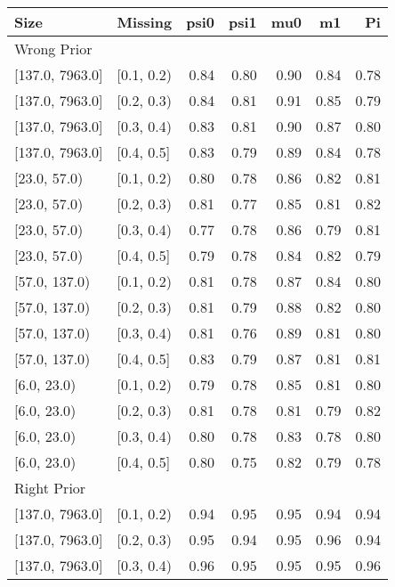 \begin{table}[ht]
\centering
\begin{tabular}{llrrrrr}
  \toprule
Size & Missing & psi0 & psi1 & mu0 & m1 & Pi \\ 
  \midrule
\multicolumn{7}{l}{Wrong Prior}\\
{[137.0, 7963.0]} & {[0.1, 0.2)} & 0.84 & 0.80 & 0.90 & 0.84 & 0.78 \\ 
  {[137.0, 7963.0]} & {[0.2, 0.3)} & 0.84 & 0.81 & 0.91 & 0.85 & 0.79 \\ 
  {[137.0, 7963.0]} & {[0.3, 0.4)} & 0.83 & 0.81 & 0.90 & 0.87 & 0.80 \\ 
  {[137.0, 7963.0]} & {[0.4, 0.5]} & 0.83 & 0.79 & 0.89 & 0.84 & 0.78 \\ 
  {[23.0, 57.0)} & {[0.1, 0.2)} & 0.80 & 0.78 & 0.86 & 0.82 & 0.81 \\ 
  {[23.0, 57.0)} & {[0.2, 0.3)} & 0.81 & 0.77 & 0.85 & 0.81 & 0.82 \\ 
  {[23.0, 57.0)} & {[0.3, 0.4)} & 0.77 & 0.78 & 0.86 & 0.79 & 0.81 \\ 
  {[23.0, 57.0)} & {[0.4, 0.5]} & 0.79 & 0.78 & 0.84 & 0.82 & 0.79 \\ 
  {[57.0, 137.0)} & {[0.1, 0.2)} & 0.81 & 0.78 & 0.87 & 0.84 & 0.80 \\ 
  {[57.0, 137.0)} & {[0.2, 0.3)} & 0.81 & 0.79 & 0.88 & 0.82 & 0.80 \\ 
  {[57.0, 137.0)} & {[0.3, 0.4)} & 0.81 & 0.76 & 0.89 & 0.81 & 0.80 \\ 
  {[57.0, 137.0)} & {[0.4, 0.5]} & 0.83 & 0.79 & 0.87 & 0.81 & 0.81 \\ 
  {[6.0, 23.0)} & {[0.1, 0.2)} & 0.79 & 0.78 & 0.85 & 0.81 & 0.80 \\ 
  {[6.0, 23.0)} & {[0.2, 0.3)} & 0.81 & 0.78 & 0.81 & 0.79 & 0.82 \\ 
  {[6.0, 23.0)} & {[0.3, 0.4)} & 0.80 & 0.78 & 0.83 & 0.78 & 0.80 \\ 
  {[6.0, 23.0)} & {[0.4, 0.5]} & 0.80 & 0.75 & 0.82 & 0.79 & 0.78 \\ 
   \midrule
\multicolumn{7}{l}{Right Prior}\\
{[137.0, 7963.0]} & {[0.1, 0.2)} & 0.94 & 0.95 & 0.95 & 0.94 & 0.94 \\ 
  {[137.0, 7963.0]} & {[0.2, 0.3)} & 0.95 & 0.94 & 0.95 & 0.96 & 0.94 \\ 
  {[137.0, 7963.0]} & {[0.3, 0.4)} & 0.96 & 0.95 & 0.95 & 0.95 & 0.96 \\ 

\end{tabular}
\end{table}
